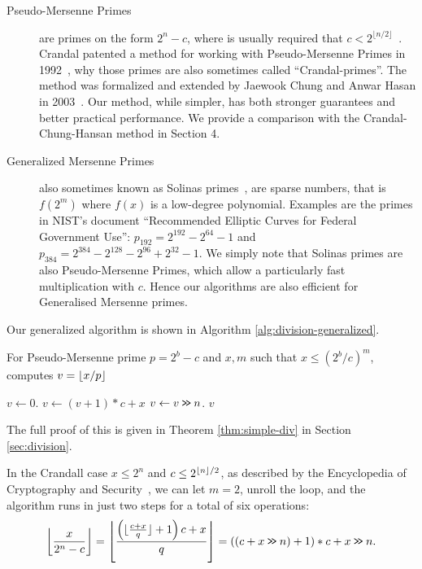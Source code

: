 \begin{description}
   \item[Pseudo-Mersenne Primes]
      are primes on the form $2^n-c$, where is usually required that $c < 2^{\lfloor n/2\rfloor}$~\cite{van2014encyclopedia}.
      Crandal patented a method for working with Pseudo-Mersenne Primes in 1992~\cite{crandall1992method},
      why those primes are also sometimes called ``Crandal-primes''.
      The method was formalized and extended by Jaewook Chung and Anwar Hasan in 2003~\cite{chung2003more}.
      Our method, while simpler, has both stronger guarantees and better practical performance.
      We provide a comparison with the Crandal-Chung-Hansan method in Section 4.
   \item[Generalized Mersenne Primes]
      also sometimes known as Solinas primes~\cite{Solinas2011}, are sparse numbers, that is $f(2^m)$ where $f(x)$ is a low-degree polynomial.
      Examples are the primes in NIST's document ``Recommended Elliptic Curves for Federal Government Use'':
         $p_{192} = 2^{192} - 2^{64} - 1$
      and
         $p_{384} = 2^{384}-2^{128}-2^{96}+2^{32}-1$.
      We simply note that Solinas primes are also Pseudo-Mersenne Primes, which allow a particularly fast multiplication with $c$.
      Hence our algorithms are also efficient for Generalised Mersenne primes.
\end{description}

Our generalized algorithm is shown in Algorithm \ref{alg:division-generalized}.
\begin{algorithm}\label{alg:division-generalized}
   \caption{For Pseudo-Mersenne prime $p=2^b-c$ and $x,m$ such that $x\leq (2^b/c)^m$, computes
      $v=\lfloor {x/p} \rfloor$}
   \begin{algorithmic}[1]
         \State $v \gets 0$.
            \State $v \gets (v + 1) * c + x$
            \State $v \gets v \mathbin{\texttt{>\!>}} n$.
         \EndFor
         \State \Return $v$
      \EndProcedure
   \end{algorithmic}
\end{algorithm}
The full proof of this is given in Theorem \ref{thm:simple-div} in Section \ref{sec:division}.

In the Crandall case $x\le 2^n$ and $c\le 2^{\lfloor {n} \rfloor/2}$, as described by the Encyclopedia of Cryptography and Security~\cite{van2014encyclopedia}, we can let $m=2$, unroll the loop, and the algorithm runs in just two steps for a total of six operations:
   $$
   \left\lfloor\frac{x}{2^n-c}\right\rfloor
   = \left\lfloor\frac{\left(\lfloor\frac{c+x}{q}\rfloor+1\right)c+x}{q}\right\rfloor
      = ((c+x \mathbin{\texttt{>\!>}} n) + 1)*c+x \mathbin{\texttt{>\!>}} n
   .$$

